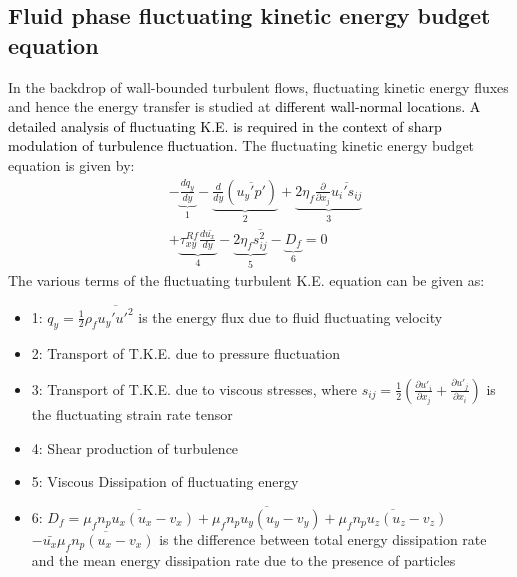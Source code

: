 \documentclass[aip,graphicx]{revtex4-1}
\begin{document}
\subsection{Fluid phase fluctuating kinetic energy budget equation}
\label{sec:fluc_ke_budget}
In the backdrop of wall-bounded turbulent flows, fluctuating kinetic energy fluxes and hence the energy transfer is studied at \textcolor{black}{different wall-normal locations. A detailed analysis of fluctuating K.E. is required in the context of sharp modulation of turbulence fluctuation.} 
The fluctuating kinetic energy budget equation is given by:
 \begin{align}
 	&-\underbrace{\frac{dq_y}{dy}}_{1}-\underbrace{\frac{d}{dy}(\overline{u_y'p'})}_{2}+\underbrace{2\eta_f\frac{\partial}{\partial  x_j}\overline{u_i's_{ij}}}_{3} \nonumber\\&+\underbrace{\tau_{xy}^{Rf}\frac{d\bar{u_x}}{dy}}_{4}-\underbrace{2\eta_f\overline{s_{ij}^2}}_{5}-\underbrace{D_f}_{6}=0
 \end{align}
 \label{fig:turb_ke}
The various terms of the fluctuating turbulent K.E. equation can be given as:
\begin{itemize}
	\item 1: $q_y=\frac{1}{2}\rho_f\overline{u_y'u'^2}$ is the energy flux due to fluid fluctuating velocity
	\item 2: Transport of T.K.E. due to pressure fluctuation 
	\item 3: Transport of T.K.E. due to viscous stresses, where $s_{ij}=\frac{1}{2}\left(\frac{\partial u'_i}{\partial x_j}+\frac{\partial u'_j}{\partial x_i}\right)$ is the fluctuating strain rate tensor
	\item 4: Shear production of turbulence
	\item 5: Viscous Dissipation of fluctuating energy
	\item 6:  $D_f=\overline{\mu_fn_pu_x(u_x-v_x)}+\overline{\mu_fn_pu_y(u_y-v_y)}+\overline{\mu_fn_pu_z(u_z-v_z)}$\\$-\bar{u_x}\overline{\mu_fn_p(u_x-v_x)}$ is the difference between total energy dissipation rate and the mean energy dissipation rate due to the presence of particles
\end{itemize} 
\end{document}

